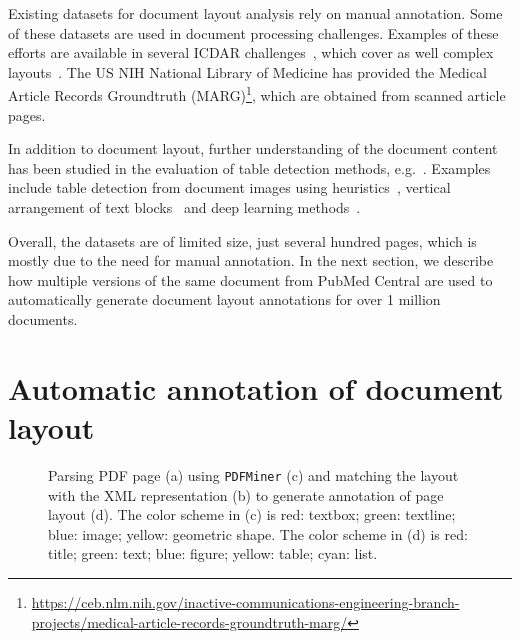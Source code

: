 \documentclass[conference]{IEEEtran}
\begin{document}
Existing datasets for document layout analysis rely on manual annotation.
Some of these datasets are used in document processing challenges.
Examples of these efforts are available in several ICDAR challenges~\cite{antonacopoulos2009realistic}, which cover as well complex layouts~\cite{clausner2015enp,clausner2017icdar2017}.
The US NIH National Library of Medicine has provided the Medical Article Records Groundtruth (MARG)\footnote{\url{https://ceb.nlm.nih.gov/inactive-communications-engineering-branch-projects/medical-article-records-groundtruth-marg/}}, which are obtained from scanned article pages.

In addition to document layout, further understanding of the document content has been studied in the evaluation of table detection methods, e.g.~\cite{shahab2010open,fang2012dataset}.
Examples include table detection from document images using heuristics~\cite{yildiz2005pdf2table}, vertical arrangement of text blocks~\cite{tran2015table} and deep learning methods~\cite{he2017multi,hao2016table,gilani2017table,kavasidis2018saliency}.

Overall, the datasets are of limited size, just several hundred pages, which is mostly due to the need for manual annotation.
In the next section, we describe how multiple versions of the same document from PubMed Central\textsuperscript{\texttrademark} are used to automatically generate document layout annotations for over 1 million documents.

\section{Automatic annotation of document layout}

\begin{figure*}[!htb]
  \centering
  \begin{minipage}[b]{.25\linewidth}\end{minipage}\begin{minipage}[b]{.25\linewidth}\centering {}\end{minipage}\begin{minipage}[b]{.25\linewidth}
  \end{minipage}\begin{minipage}[b]{.25\linewidth}
  \end{minipage}\caption{Parsing PDF page (a) using \texttt{PDFMiner} (c) and matching the layout with the XML representation (b) to generate annotation of page layout (d). The color scheme in (c) is red: textbox; green: textline; blue: image; yellow: geometric shape. The color scheme in (d) is red: title; green: text; blue: figure; yellow: table; cyan: list.}
\end{figure*}
\end{document}
